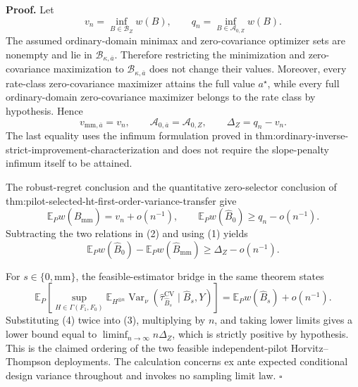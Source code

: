 \textbf{Proof.}
Let
\[
v_n=\inf_{B\in\mathcal B_Z}w(B),
\qquad
q_n=\inf_{B\in\mathcal A_{0,Z}}w(B).
\]
The assumed ordinary-domain minimax and zero-covariance optimizer sets are nonempty and lie in \(\mathcal B_{\kappa,\overline a}\).  Therefore restricting the minimization and zero-covariance maximization to \(\mathcal B_{\kappa,\overline a}\) does not change their values.  Moreover, every rate-class zero-covariance maximizer attains the full value \(a^\star\), while every full ordinary-domain zero-covariance maximizer belongs to the rate class by hypothesis.  Hence
\[
v_{\mathrm{mm},\overline a}=v_n,
\qquad
\mathcal A_{0,\overline a}=\mathcal A_{0,Z},
\qquad
\Delta_Z=q_n-v_n.
\tag{1}
\]
The last equality uses the infimum formulation proved in thm:ordinary-inverse-strict-improvement-characterization and does not require the slope-penalty infimum itself to be attained.

The robust-regret conclusion and the quantitative zero-selector conclusion of thm:pilot-selected-ht-first-order-variance-transfer give
\[
\mathbb E_Pw(\widehat B_{\mathrm{mm}})=v_n+o(n^{-1}),
\qquad
\mathbb E_Pw(\widehat B_0)\ge q_n-o(n^{-1}).
\tag{2}
\]
Subtracting the two relations in (2) and using (1) yields
\[
\mathbb E_Pw(\widehat B_0)
-\mathbb E_Pw(\widehat B_{\mathrm{mm}})
\ge\Delta_Z-o(n^{-1}).
\tag{3}
\]

For \(s\in\{0,\mathrm{mm}\}\), the feasible-estimator bridge in the same theorem states
\[
\mathbb E_P\left[
\sup_{H\in\Gamma(F_1,F_0)}
\mathbb E_{H^{\otimes n}}
\operatorname{Var}_\nu
(\widehat\tau_{\widehat B_s}^{\mathrm{CV}}
\mid\widehat B_s,Y)
\right]
=\mathbb E_Pw(\widehat B_s)+o(n^{-1}).
\tag{4}
\]
Substituting (4) twice into (3), multiplying by \(n\), and taking lower limits gives a lower bound equal to \(\liminf_{n\to\infty}n\Delta_Z\), which is strictly positive by hypothesis.  This is the claimed ordering of the two feasible independent-pilot Horvitz--Thompson deployments.  The calculation concerns ex ante expected conditional design variance throughout and invokes no sampling limit law. \(\square\)